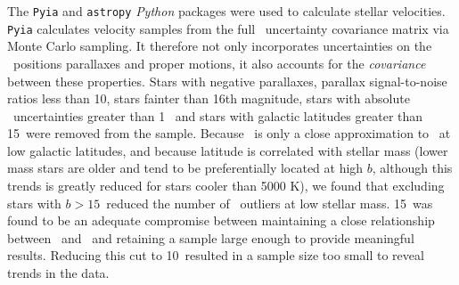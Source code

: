 The {\tt Pyia} \citep{price-whelan_2018} and {\tt astropy} \citep{astropy2013,
astropy2018} {\it Python} packages were used to calculate stellar velocities.
{\tt Pyia} calculates velocity samples from the full \gaia\ uncertainty
covariance matrix via Monte Carlo sampling.
It therefore not only incorporates uncertainties on the \gaia\ positions
parallaxes and proper motions, it also accounts for the {\it covariance}
between these properties.
Stars with negative parallaxes, parallax signal-to-noise ratios less than 10,
stars fainter than 16th magnitude, stars with absolute \vb\ uncertainties
greater than 1 \kms\, and stars with galactic latitudes greater than
15\degrees\ were removed from the sample.
Because \vb\ is only a close approximation to \vz\ at low galactic latitudes,
and because latitude is correlated with stellar mass (lower mass stars are
older and tend to be preferentially located at high $b$, although this trends
is greatly reduced for stars cooler than 5000 K), we found that excluding
stars with $b > 15$\degrees\ reduced the number of \vb\ outliers at low
stellar mass.
15\degrees\ was found to be an adequate compromise between maintaining a close
relationship between \vb\ and \vz\ and retaining a sample large enough to
provide meaningful results.
Reducing this cut to 10\degrees\ resulted in a sample size too small to reveal
trends in the data.

